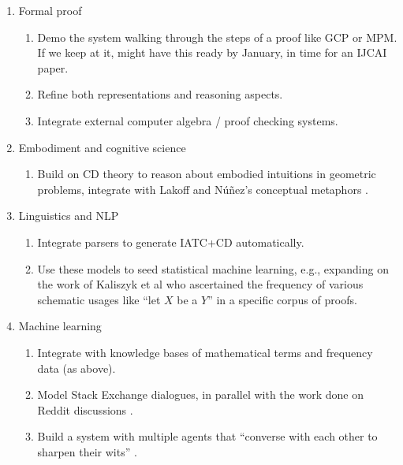 \documentclass[11pt]{article}
\begin{document}
\begin{enumerate}
\begin{enumerate}
\item Formal proof
\label{sec:orgb7b5e7f}
\begin{enumerate}
\item Demo the system walking through the steps of a proof like GCP or MPM.
\label{sec:orgc2c76d8}
If we keep at it, might have this ready by January, in time for an
IJCAI paper.
\item Refine both representations and reasoning aspects.
\label{sec:orgdec8ef6}
\item Integrate external computer algebra / proof checking systems.
\label{sec:org44ca589}
\end{enumerate}
\item Embodiment and cognitive science
\label{sec:org6318fe4}
\begin{enumerate}
\item Build on CD theory to reason about embodied intuitions in geometric problems, integrate with Lakoff and Núñez's conceptual metaphors \cite{kaliszyk2014developing-misc}.
\label{sec:org25df499}
\end{enumerate}
\item Linguistics and NLP
\label{sec:orgb0b9bf4}
\begin{enumerate}
\item Integrate parsers to generate IATC+CD automatically.
\label{sec:org84e7b0b}
\item Use these models to seed statistical machine learning, e.g., expanding on the work of Kaliszyk et al who ascertained the frequency of various schematic usages like ``let \(X\) be a \(Y\)'' in a specific corpus of proofs.
\label{sec:org4406651}
\end{enumerate}
\item Machine learning
\label{sec:orgce41bd7}
\begin{enumerate}
\item Integrate with knowledge bases of mathematical terms and frequency data (as above).
\label{sec:org3bbc334}
\item Model Stack Exchange dialogues, in parallel with the work done  on Reddit discussions \cite{zhang2017characterizing}.
\label{sec:orgc8921e0}
\item Build a system with multiple agents that ``converse with each other to sharpen their wits'' \cite{heretical-theory}.
\label{sec:orgef1ea35}
\end{enumerate}
\end{enumerate}
\end{enumerate}
\end{document}
